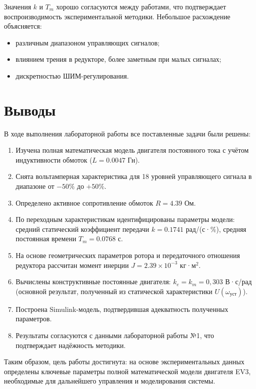 \documentclass[a4paper, 12pt]{article}
\begin{document}
Значения $k$ и $T_m$ хорошо согласуются между работами, что подтверждает воспроизводимость экспериментальной методики. Небольшое расхождение объясняется:
\begin{itemize}
    \item различным диапазоном управляющих сигналов;
    \item влиянием трения в редукторе, более заметным при малых сигналах;
    \item дискретностью ШИМ-регулирования.
\end{itemize}

\section{Выводы}

В ходе выполнения лабораторной работы все поставленные задачи были решены:

\begin{enumerate}
    \item Изучена полная математическая модель двигателя постоянного тока с учётом индуктивности обмоток ($L = 0.0047$ Гн).
    \item Снята вольтамперная характеристика для 18 уровней управляющего сигнала в диапазоне от $-50\%$ до $+50\%$.
    \item Определено активное сопротивление обмоток $R = 4.39$ Ом.
    \item По переходным характеристикам идентифицированы параметры модели: средний статический коэффициент передачи $k = 0.1741$ рад/(с·\%), средняя постоянная времени $T_m = 0.0768$ с.
    \item На основе геометрических параметров ротора и передаточного отношения редуктора рассчитан момент инерции $J = 2.39 \times 10^{-3}$ кг·м$^2$.
\item Вычислены конструктивные постоянные двигателя: $k_e = k_m = 0,303$ В·с/рад (основной результат, полученный из статической характеристики $U(\omega_{\text{уст}})$).
    \item Построена Simulink-модель, подтвердившая адекватность полученных параметров.
    \item Результаты согласуются с данными лабораторной работы №1, что подтверждает надёжность методики.
\end{enumerate}

Таким образом, цель работы достигнута: на основе экспериментальных данных определены ключевые параметры полной математической модели двигателя EV3, необходимые для дальнейшего управления и моделирования системы.
\end{document}
